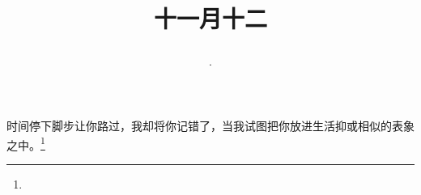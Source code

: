 \title{\date[d=12,m=12,y=2024][year:cn-y,年,month:cn,day:cn,日,·,weekday]·十一月十二 }
时间停下脚步让你路过，我却将你记错了，当我试图把你放进生活抑或相似的表象之中。\footnote{ }

